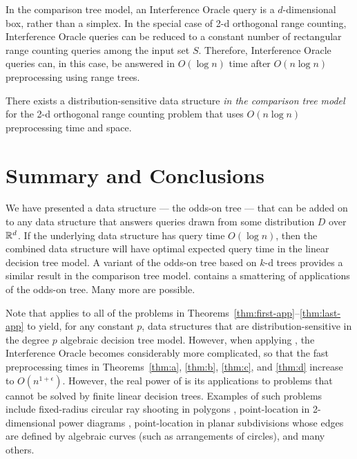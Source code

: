 \documentclass{patmorin}
\begin{document}
In the comparison tree model, an Interference Oracle query is a
$d$-dimensional box, rather than a simplex. In the special case of 2-d
orthogonal range counting, Interference Oracle queries can be reduced to
a constant number of rectangular range counting queries among the input
set $S$.  Therefore, Interference Oracle queries can, in this case,
be answered in $O(\log n)$ time after $O(n\log n)$ preprocessing using
range trees.

\begin{thm}
  There exists a distribution-sensitive data structure \emph{in the
  comparison tree model} for the 2-d orthogonal range counting problem
  that uses $O(n\log n)$ preprocessing time and space.
\end{thm}

\section{Summary and Conclusions}

We have presented a data structure --- the odds-on tree --- that can
be added on to any data structure that answers queries drawn from some
distribution $D$ over $\mathbb{R}^d$.  If the underlying data structure has query
time $O(\log n)$, then the combined data structure will have optimal
expected query time in the linear decision tree model.  A variant of
the odds-on tree based on $k$-d trees provides a similar result in the
comparison tree model.   contains a smattering of
applications of the odds-on tree.  Many more are possible.

Note that  applies to all of the problems
in Theorems~\ref{thm:first-app}--\ref{thm:last-app} to yield, for
any constant $p$, data structures that are distribution-sensitive
in the degree $p$ algebraic decision tree model.  However, when
applying , the Interference Oracle becomes
considerably more complicated, so that the fast preprocessing times in
Theorems~\ref{thm:a}, \ref{thm:b}, \ref{thm:c}, and \ref{thm:d} increase
to $O(n^{1+\epsilon})$.
However, the real power of  is its applications
to problems that cannot be solved by finite linear decision trees.
Examples of such problems include fixed-radius circular ray shooting in
polygons \cite{cceo04}, point-location in 2-dimensional power diagrams
\cite{a87}, point-location in planar subdivisions whose edges are defined
by algebraic curves (such as arrangements of circles), and many others.
\end{document}
